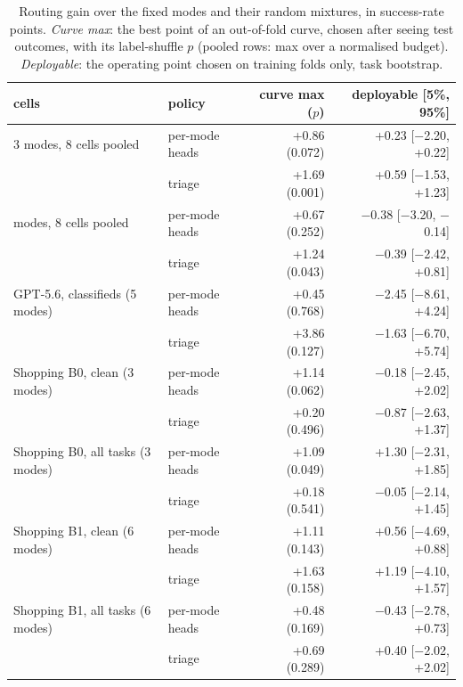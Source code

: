 \begin{table}[t]
\centering\small
\setlength{\tabcolsep}{6pt}
\begin{tabular}{@{}llrr@{}}
\toprule
cells & policy & curve max ($p$) & deployable [5\%, 95\%] \\
\midrule
3 modes, 8 cells pooled & per-mode heads & +0.86 (0.072) & +0.23 [$-$2.20, +0.22] \\
 & triage & +1.69 (0.001) & +0.59 [$-$1.53, +1.23] \\
\addlinespace[2pt]
6 modes, 8 cells pooled & per-mode heads & +0.67 (0.252) & $-$0.38 [$-$3.20, $-$0.14] \\
 & triage & +1.24 (0.043) & $-$0.39 [$-$2.42, +0.81] \\
\addlinespace[2pt]
GPT-5.6, classifieds (5 modes) & per-mode heads & +0.45 (0.768) & $-$2.45 [$-$8.61, +4.24] \\
 & triage & +3.86 (0.127) & $-$1.63 [$-$6.70, +5.74] \\
\addlinespace[2pt]
Shopping B0, clean (3 modes) & per-mode heads & +1.14 (0.062) & $-$0.18 [$-$2.45, +2.02] \\
 & triage & +0.20 (0.496) & $-$0.87 [$-$2.63, +1.37] \\
\addlinespace[2pt]
Shopping B0, all tasks (3 modes) & per-mode heads & +1.09 (0.049) & +1.30 [$-$2.31, +1.85] \\
 & triage & +0.18 (0.541) & $-$0.05 [$-$2.14, +1.45] \\
\addlinespace[2pt]
Shopping B1, clean (6 modes) & per-mode heads & +1.11 (0.143) & +0.56 [$-$4.69, +0.88] \\
 & triage & +1.63 (0.158) & +1.19 [$-$4.10, +1.57] \\
\addlinespace[2pt]
Shopping B1, all tasks (6 modes) & per-mode heads & +0.48 (0.169) & $-$0.43 [$-$2.78, +0.73] \\
 & triage & +0.69 (0.289) & +0.40 [$-$2.02, +2.02] \\
\bottomrule
\end{tabular}
\caption{Routing gain over the fixed modes and their random mixtures, in success-rate points. \emph{Curve max}: the best point of an out-of-fold curve, chosen after seeing test outcomes, with its label-shuffle $p$ (pooled rows: max over a normalised budget). \emph{Deployable}: the operating point chosen on training folds only, task bootstrap.}
\label{tab:routing}
\end{table}

